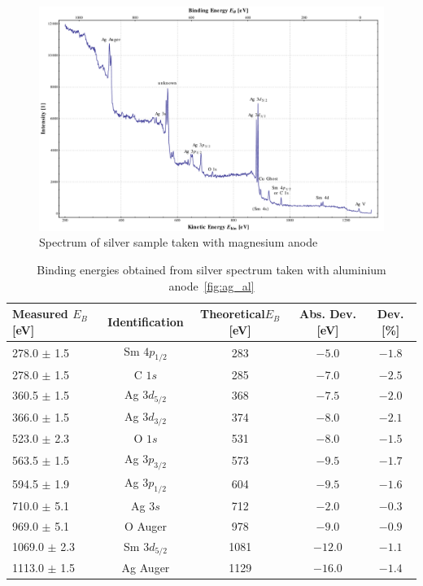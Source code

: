 \documentclass[a4paper,10pt]{scrartcl}
\begin{document}
\begin{figure}
\centering
\includegraphics[scale=0.3]{img/silver_binding_mg}
\caption{Spectrum of silver sample taken with magnesium anode \label{fig:ag_mg}}
\end{figure}


\begin{table}
\begin{center}
\begin{tabular}{lcccc}
\toprule
Measured $E_{B}$ [eV]        & Identification & Theoretical$E_{B}$ [eV] & Abs. Dev. [eV] & Dev. [\%]\\
\midrule
\phantom{0}278.0 $\pm$ 1.5   & Sm $4p_{1/2}$  & 283                     & $-5.0$         & $-1.8$\\
\phantom{0}278.0 $\pm$ 1.5   & C $1s$         & 285                     & $-7.0$         & $-2.5$\\
\phantom{0}360.5 $\pm$ 1.5   & Ag $3d_{5/2}$  & 368                     & $-7.5$         & $-2.0$\\
\phantom{0}366.0 $\pm$ 1.5   & Ag $3d_{3/2}$  & 374                     & $-8.0$         & $-2.1$\\
\phantom{0}523.0 $\pm$ 2.3   & O $1s$         & 531                     & $-8.0$         & $-1.5$\\
\phantom{0}563.5 $\pm$ 1.5   & Ag $3p_{3/2}$  & 573                     & $-9.5$         & $-1.7$\\
\phantom{0}594.5 $\pm$ 1.9   & Ag $3p_{1/2}$  & 604                     & $-9.5$         & $-1.6$\\
\phantom{0}710.0 $\pm$ 5.1   & Ag $3s$        & 712                     & $-2.0$         & $-0.3$\\
\phantom{0}969.0 $\pm$ 5.1   & O Auger        & 978                     & $-9.0$         & $-0.9$\\
1069.0 $\pm$ 2.3             & Sm $3d_{5/2}$  & 1081                    & $-12.0$        & $-1.1$\\
1113.0 $\pm$ 1.5             & Ag Auger       & 1129                    & $-16.0$        & $-1.4$\\
\bottomrule
\end{tabular}
\end{center}
\par
\caption{Binding energies obtained from silver spectrum taken with aluminium anode~\ref{fig:ag_al} \label{tab:ag_al_ident}}
\end{table}
\end{document}
